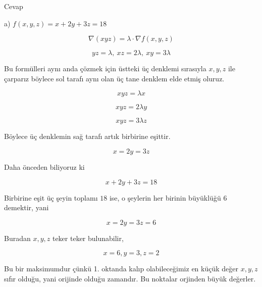 \documentclass[12pt,fleqn]{article}\usepackage{../../common}
\begin{document}
Cevap

a) $f(x,y,z) = x + 2y + 3z = 18$

$$
\nabla (xyz) = \lambda \cdot \nabla f(x,y,z)
$$

$$ yz = \lambda, \ xz = 2\lambda, \ xy = 3\lambda $$

Bu formülleri aynı anda çözmek için üstteki üç denklemi sırasıyla $x,y,z$
ile çarparız böylece sol tarafı aynı olan üç tane denklem elde etmiş
oluruz. 

$$ xyz = \lambda x $$

$$ xyz = 2 \lambda y $$

$$ xyz = 3 \lambda z $$

Böylece üç denklemin sağ tarafı artık birbirine eşittir. 

$$ x = 2y = 3z $$

Daha önceden biliyoruz ki

$$ x + 2y + 3z = 18 $$

Birbirine eşit üç şeyin toplamı $18$ ise, o şeylerin her birinin büyüklüğü
$6$ demektir, yani 

$$ x = 2y = 3z = 6$$

Buradan $x,y,z$ teker teker bulunabilir,

$$ x = 6, y=3, z= 2 $$

Bu bir maksimumdur çünkü 1. oktanda kalıp olabileceğimiz en küçük değer
$x,y,z$ sıfır olduğu, yani orijinde olduğu zamandır. Bu noktalar orjinden
büyük değerler. 
\end{document}

